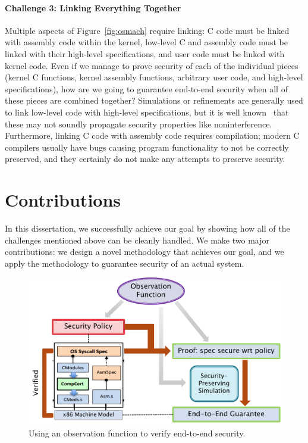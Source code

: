 \paragraph{Challenge 3: Linking Everything Together}
Multiple aspects of Figure~\ref{fig:osmach} require linking:
C code must be linked with assembly code within the kernel, 
low-level C and assembly code must be linked with their 
high-level specifications, and user code must be linked
with kernel code. Even if we manage to prove security of
each of the individual pieces (kernel C functions, kernel
assembly functions, arbitrary user code, and high-level
specifications), how are we going to guarantee end-to-end
security when all of these pieces are combined together?
Simulations or refinements are generally used to link low-level
code with high-level specifications, but it is well 
known~\cite{jurjens,morgan09} that these may not soundly propagate 
security properties like noninterference. Furthermore, linking C 
code with assembly code requires compilation; modern C compilers usually 
have bugs causing program functionality to not be correctly preserved, 
and they certainly do not make any attempts to preserve security.

\section{Contributions}
In this dissertation, we successfully achieve our goal by
showing how all of the challenges mentioned above can be cleanly
handled. We make two major contributions: we design a novel
methodology that achieves our goal, and we apply the methodology
to guarantee security of an actual system.

\begin{figure}[t]
\begin{center}
\includegraphics[scale=0.5]{pldi/figure/methodology}
\caption{\small Using an observation function to verify end-to-end
security.}
\label{fig:methodology}
\end{center}
\end{figure}

